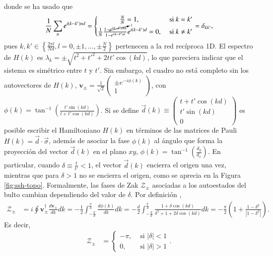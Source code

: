 donde se ha usado que $$\frac{1}{N}\sum_n e^{i(k-k')nd} = \left\{\begin{matrix} \frac{N}{N}=1, &\text{ si } k = k'
\\ \frac{1}{N}\frac{1-\cancelto{1}{e^{i(k-k')Nd}}}{1-e^{i(k-k')d}}e^{i(k-k')d}=0, &\text{ si } k\neq k'
\end{matrix}\right. =\delta_{kk'},$$ pues $k, k' \in  \left\{\frac{2\pi l}{Nd}, l=0,\pm 1, \dots , \pm \frac{N}{2}\right\}$ pertenecen a la red recíproca 1D. El espectro de $H(k)$ es $\lambda_k = \pm\sqrt{t^2+t'^2+2tt'\cos(kd)}$, lo que pareciera indicar que el sistema es simétrico entre $t$ y $t'$. Sin embargo, el cuadro no está completo sin los autovectores de $H(k)$, $\textbf{v}_\pm =\frac{1}{\sqrt{2}} \begin{pmatrix} \pm e^{-i\phi(k)} \\  1 \end{pmatrix}$, con $\phi(k)=\tan^{-1}\left(\frac{t'\sin(kd)}{t+t'\cos(kd)}\right)$. Si se define $\vec{d}(k) \equiv \begin{pmatrix}t+t'\cos(kd) \\ t'\sin(kd) \\ 0 \end{pmatrix}$ es posible escribir el Hamiltoniano $H(k)$ en términos de las matrices de Pauli $H(k) = \vec{d} \cdot \vec{\sigma}$, además de asociar la fase $\phi(k)$ al ángulo que forma la proyección del vector $\vec{d}(k)$ en el plano $xy$,  $\phi(k)=\tan^{-1}\left( \frac{d_y}{d_x} \right)$. En particular, cuando $\delta \equiv \frac{t}{t'} < 1$, el vector $\vec{d}(k)$ encierra el origen una vez, mientras que para $\delta > 1$ no se encierra el origen, como se aprecia en la Figura \ref{fig:ssh-topo}. Formalmente, las fases de Zak $\mathcal{Z}_\pm$ asociadas a los autoestados del bulto cambian dependiendo del valor de $\delta$. Por definición \citep{zak_berry}, \begin{align*}
\mathcal{Z}_\pm &= i \oint \textbf{v}_\pm^\dagger \frac{d \textbf{v}_\pm}{dk}  dk  = -\frac{1}{2} \int_{-\frac{\pi}{d}}^{{\frac{\pi}{d}}}  \frac{d \phi(k)}{d k} dk = -\frac{d}{2}\int_{-\frac{\pi}{d}}^{{\frac{\pi}{d}}} \frac{1+\delta\cos(kd)}{\delta^2+1+2\delta\cos(kd)} dk = -\frac{\pi}{2} \left(1 + \frac{1-\delta^2}{\left|1-\delta^2\right|} \right) .
\end{align*}
Es decir, 
\begin{align*}
\mathcal{Z}_\pm &= \left\{\begin{matrix}
-\pi, &\text{ si } |\delta| < 1
\\
0, &\text{ si } |\delta| > 1
\end{matrix}\right. .
\end{align*}
